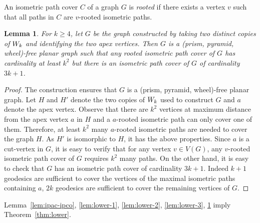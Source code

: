 \documentclass[a4paper]{article}
\newcommand{\dist}[2]{\mathsf{d}\left(#1,#2\right)}
\newcommand{\treelength}[1]{tl\left(#1\right)}
\newtheorem{lemma}[theorem]{Lemma}
\begin{document}
 {
An isometric path cover $C$ of a graph $G$ is \emph{rooted} if there exists a vertex $v$ such that all paths in $C$ are $v$-rooted isometric paths.

\begin{lemma}\label{lem:lower-4}
For $k\geq 4$, let $G$ be the graph constructed by taking two distinct copies of $W_{k}$ and identifying the two apex vertices. Then $G$ is a (prism, pyramid, wheel)-free planar graph such that any rooted isometric path cover of $G$ has cardinality at least $k^2$ but there is an isometric path cover of $G$ of cardinality $3k+1$.
\end{lemma}

\begin{proof}
      The construction ensures that $G$ is a (prism, pyramid, wheel)-free planar graph. Let $H$ and $H'$ denote the two copies of $W_{k}$ used to construct $G$ and $a$ denote the apex vertex. Observe that there are $k^2$ vertices at maximum distance from the apex vertex $a$ in $H$ and a $a$-rooted isometric path can only cover one of them. Therefore, at least $k^2$ many $a$-rooted isometric paths are needed to cover the graph $H$. As $H'$ is isomorphic to $H$, it has the above properties. Since $a$ is a cut-vertex in $G$, it is easy to verify that for any vertex $v\in V(G)$, any $v$-rooted isometric path cover of $G$ requires $k^2$ many paths. On the other hand, it is easy to check that $G$ has an isometric path cover of cardinality $3k+1$. Indeed $k+1$ geodesics are sufficient to cover the vertices of the maximal isometric paths containing $a$, $2k$ geodesics are sufficient to cover the remaining vertices of $G$.
\end{proof}

}

Lemma~\ref{lem:ipac-ipco}, \ref{lem:lower-1}, \ref{lem:lower-2}, \ref{lem:lower-3}, \ref{lem:lower-4} imply Theorem~\ref{thm:lower}.

\end{document}
